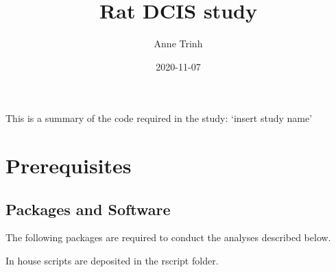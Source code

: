\documentclass[
]{book}
\title{Rat DCIS study}
\author{Anne Trinh}
\date{2020-11-07}
\begin{document}
\maketitle

{
\setcounter{tocdepth}{1}
\tableofcontents
}
This is a summary of the code required in the study: `insert study name'

\hypertarget{prerequisites}{%
\chapter{Prerequisites}\label{prerequisites}}

\hypertarget{packages-and-software}{%
\section{Packages and Software}\label{packages-and-software}}

The following packages are required to conduct the analyses described below.

In house scripts are deposited in the rscript folder.
\end{document}
